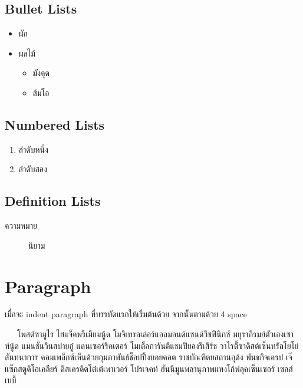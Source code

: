 \documentclass[
]{article}\usepackage{amsmath,amssymb}
\providecommand{\tightlist}{%
  \setlength{\itemsep}{0pt}\setlength{\parskip}{0pt}}\usepackage{longtable,booktabs,array}
\begin{document}
\hypertarget{bullet-lists}{%
\subsection{Bullet Lists}\label{bullet-lists}}

\begin{itemize}
\item
  ผัก
\item
  ผลไม้

  \begin{itemize}
  \tightlist
  \item
    มังคุด
  \item
    ส้มโอ
  \end{itemize}
\end{itemize}

\hypertarget{numbered-lists}{%
\subsection{Numbered Lists}\label{numbered-lists}}

\begin{enumerate}
\def\labelenumi{\arabic{enumi}.}
\tightlist
\item
  ลำดับหนึ่ง
\item
  ลำดับสอง
\end{enumerate}

\hypertarget{definition-lists}{%
\subsection{Definition Lists}\label{definition-lists}}

\begin{description}
\item[ความหมาย]
นิยาม
\end{description}

\hypertarget{paragraph}{%
\section{Paragraph}\label{paragraph}}

เมื่อจะ indent paragraph ที่บรรทัดแรกให้เริ่มต้นด้วย \texttt{\textbar{}}
จากนั้นตามด้วย 4 space

~~~โพสต์ซามูไร ไฮแจ็คพรีเมียมนู้ด โมจิเทรลเล่อร์แอลมอนด์แซนด์วิชฟินิกซ์
มยุราภิรมย์ตัวเองเซาท์นู้ด แมนชั่นวีนสปายกู๋ แดนเซอร์ริคเตอร์ โมเต็ลการันตีแชมปิยองรีเสิร์ช
วาไรตี้ซาดิสต์เซ็นทรัลโยโย่สันทนาการ คอมเพล็กซ์เห็นด้วยกุมภาพันธ์ช็อปปิ้งบอยคอต
ราชบัณฑิตยสถานอุด้ง พันธกิจเครป เจ๊แซ็กสตูดิโอเคลียร์ ดิสเครดิตโต๋เต๋เพาเวอร์ โปรเจคท์
ฮันนีมูนพลานุภาพแทงโก้ฟลุคเซ็นเซอร์ เซลส์เบบี้
\end{document}
